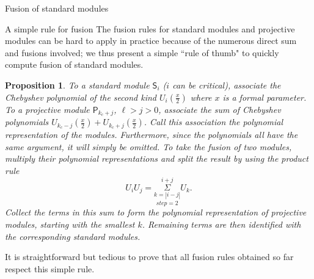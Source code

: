 \documentclass[reqno]{amsart}
\newtheorem{Prop}[Thm]{Proposition}
\newcommand{\ds}[1]{\mathsf S_{#1}}
\newcommand{\dP}[1]{\mathsf P_{#1}}
\newcommand{\kc}{k_c}
\newcommand{\lc}{\ell}
\begin{document}
\begin{section}{Fusion of standard modules}
\begin{subsection}{A simple rule for fusion}
The fusion rules for standard modules and projective modules can be hard to apply in practice because of the numerous direct sum and fusions involved; we thus present a simple ``rule of thumb" to quickly compute fusion of standard modules.
\begin{Prop}
To a standard module $\ds{i}$ ($i$ can be critical), associate the Chebyshev polynomial of the second kind $U_{i}(\frac{x}{2})$ where $x$ is a formal parameter. To a projective module $\dP{\kc +j}$, $\lc>j>0$, associate the sum of Chebyshev polynomials $U_{\kc-j}(\frac{x}{2}) + U_{\kc +j}(\frac{x}{2})$. Call this association the \emph{polynomial representation} of the modules. Furthermore, since the polynomials all have the same argument, it will simply be omitted. To take the fusion of two modules, multiply their polynomial representations and split the result by using the product rule $$ U_{i}U_{j} = \overset{i+j}{\underset{step =2}{\underset{k=|i-j|}{\Sigma}}} U_{k}.$$ Collect the terms in this sum to form the polynomial representation of projective modules, starting with the smallest $k$. Remaining terms are then identified with the corresponding standard modules.
\end{Prop}
It is straightforward but tedious to prove that all fusion rules obtained so far respect this simple rule. %
\end{subsection}
\end{section}
\end{document}

